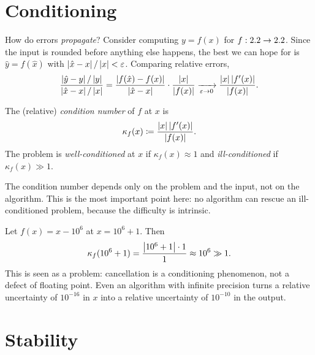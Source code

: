 \section{Conditioning}
\label{sec:conditioning}

How do errors \emph{propagate}? Consider computing $y = f(x)$ for $f : 2.2 \to 2.2$. Since the input is rounded before anything else happens, the best we can hope for is $\hat{y} = f(\hat{x})$ with $\left\lvert \hat{x} - x \right\rvert/\left\lvert x \right\rvert < \varepsilon$. Comparing relative errors,
\begin{equation}
  \frac{\left\lvert \hat{y} - y \right\rvert/\left\lvert y \right\rvert}{\left\lvert \hat{x} - x \right\rvert/\left\lvert x \right\rvert} = \frac{\left\lvert f(\hat{x}) - f(x) \right\rvert}{\left\lvert \hat{x} - x \right\rvert} \cdot \frac{\left\lvert x \right\rvert}{\left\lvert f(x) \right\rvert} \xrightarrow[\varepsilon \to 0]{} \frac{\left\lvert x \right\rvert\left\lvert f'(x) \right\rvert}{\left\lvert f(x) \right\rvert}.
\end{equation}

\begin{definition}
  \label{def:cond}
  The (relative) \emph{condition number} of $f$ at $x$ is
  \begin{equation}
    \kappa_f(x) \coloneqq \frac{\left\lvert x \right\rvert\left\lvert f'(x) \right\rvert}{\left\lvert f(x) \right\rvert}.
  \end{equation}
  The problem is \emph{well-conditioned} at $x$ if $\kappa_f(x) \approx 1$ and \emph{ill-conditioned} if $\kappa_f(x) \gg 1$.
\end{definition}

The condition number depends only on the problem and the input, not on the algorithm. This is the most important point here: no algorithm can rescue an ill-conditioned problem, because the difficulty is intrinsic.

\begin{example}
  Let $f(x) = x - 10^6$ at $x = 10^6 + 1$. Then
  \begin{equation}
    \kappa_f(10^6 + 1) = \frac{\left\lvert 10^6 + 1 \right\rvert \cdot 1}{1} \approx 10^6 \gg 1.
  \end{equation}
  This is  seen as a problem: cancellation is a conditioning phenomenon, not a defect of floating point. Even an algorithm with infinite precision turns a relative uncertainty of $10^{-16}$ in $x$ into a relative uncertainty of $10^{-10}$ in the output.
\end{example}

\section{Stability}
\label{sec:stability}

